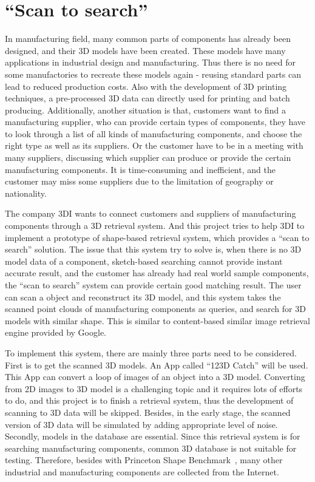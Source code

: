 \section{``Scan to search''} \label{sec:designchoice}

In manufacturing field, many common parts of components has already been designed, and their 3D models have been created. These models have many applications in industrial design and manufacturing. Thus there is no need for some manufactories to recreate these models again - reusing standard parts can lead to reduced production costs. Also with the development of 3D printing techniques, a pre-processed 3D data can directly used for printing and batch producing. Additionally, another situation is that, customers want to find a manufacturing supplier, who can provide certain types of components, they have to look through a list of all kinds of manufacturing components, and choose the right type as well as its suppliers. Or the customer have to be in a meeting with many suppliers, discussing which supplier can produce or provide the certain manufacturing components. It is time-consuming and inefficient, and the customer may miss some suppliers due to the limitation of geography or nationality. 

The company 3DI wants to connect customers and suppliers of manufacturing components through a 3D retrieval system. And this project tries to help 3DI to implement a prototype of shape-based retrieval system, which provides a ``scan to search'' solution. The issue that this system try to solve is, when there is no 3D model data of a component, sketch-based searching cannot provide instant accurate result, and the customer has already had real world sample components, the ``scan to search'' system can provide certain good matching result. The user can scan a object and reconstruct its 3D model, and this system takes the scanned point clouds of manufacturing components as queries, and search for 3D models with similar shape. This is similar to content-based similar image retrieval engine provided by Google. 

To implement this system, there are mainly three parts need to be considered. First is to get the scanned 3D models. An App called ``123D Catch'' will be used. This App can convert a loop of images of an object into a 3D model. Converting from 2D images to 3D model is a challenging topic and it requires lots of efforts to do, and this project is to finish a retrieval system, thus the development of scanning to 3D data will be skipped. Besides, in the early stage, the scanned version of 3D data will be simulated by adding appropriate level of noise. Secondly, models in the database are essential. Since this retrieval system is for searching  manufacturing components, common 3D database is not suitable for testing. Therefore, besides with  Princeton Shape Benchmark~\cite{shilane2004princeton}, many other industrial and manufacturing components are collected from the Internet.

